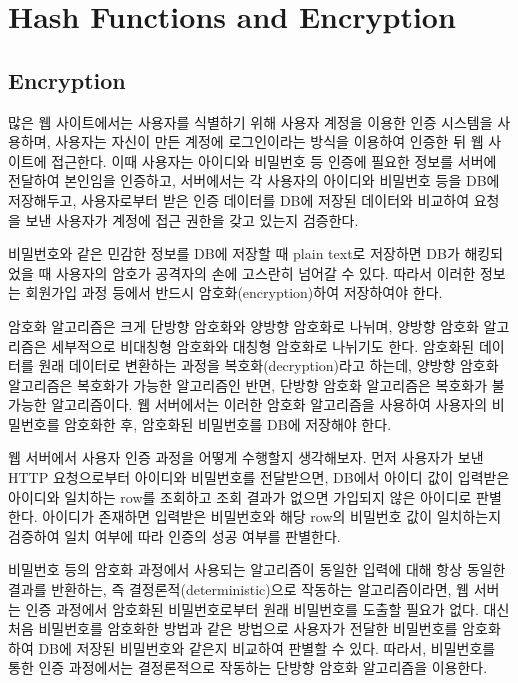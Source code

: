 \section{Hash Functions and Encryption}\label{sect:hash-functions-and-encryption}

\subsection*{Encryption}

많은 웹 사이트에서는 사용자를 식별하기 위해 사용자 계정을 이용한 인증 시스템을 사용하며, 사용자는 자신이 만든 계정에 로그인이라는 방식을 이용하여 인증한 뒤 웹 사이트에 접근한다. 이때 사용자는 아이디와 비밀번호 등 인증에 필요한 정보를 서버에 전달하여 본인임을 인증하고, 서버에서는 각 사용자의 아이디와 비밀번호 등을 DB에 저장해두고, 사용자로부터 받은 인증 데이터를 DB에 저장된 데이터와 비교하여 요청을 보낸 사용자가 계정에 접근 권한을 갖고 있는지 검증한다.

비밀번호와 같은 민감한 정보를 DB에 저장할 때 plain text로 저장하면 DB가 해킹되었을 때 사용자의 암호가 공격자의 손에 고스란히 넘어갈 수 있다. 따라서 이러한 정보는 회원가입 과정 등에서 반드시 암호화(encryption)하여 저장하여야 한다.

암호화 알고리즘은 크게 단방향 암호화와 양방향 암호화로 나뉘며, 양방향 암호화 알고리즘은 세부적으로 비대칭형 암호화와 대칭형 암호화로 나뉘기도 한다. 암호화된 데이터를 원래 데이터로 변환하는 과정을 복호화(decryption)라고 하는데, 양방향 암호화 알고리즘은 복호화가 가능한 알고리즘인 반면, 단방향 암호화 알고리즘은 복호화가 불가능한 알고리즘이다. 웹 서버에서는 이러한 암호화 알고리즘을 사용하여 사용자의 비밀번호를 암호화한 후, 암호화된 비밀번호를 DB에 저장해야 한다.

웹 서버에서 사용자 인증 과정을 어떻게 수행할지 생각해보자. 먼저 사용자가 보낸 HTTP 요청으로부터 아이디와 비밀번호를 전달받으면, DB에서 아이디 값이 입력받은 아이디와 일치하는 row를 조회하고 조회 결과가 없으면 가입되지 않은 아이디로 판별한다. 아이디가 존재하면 입력받은 비밀번호와 해당 row의 비밀번호 값이 일치하는지 검증하여 일치 여부에 따라 인증의 성공 여부를 판별한다.

비밀번호 등의 암호화 과정에서 사용되는 알고리즘이 동일한 입력에 대해 항상 동일한 결과를 반환하는, 즉 결정론적(deterministic)으로 작동하는 알고리즘이라면, 웹 서버는 인증 과정에서 암호화된 비밀번호로부터 원래 비밀번호를 도출할 필요가 없다. 대신 처음 비밀번호를 암호화한 방법과 같은 방법으로 사용자가 전달한 비밀번호를 암호화하여 DB에 저장된 비밀번호와 같은지 비교하여 판별할 수 있다. 따라서, 비밀번호를 통한 인증 과정에서는 결정론적으로 작동하는 단방향 암호화 알고리즘을 이용한다.

